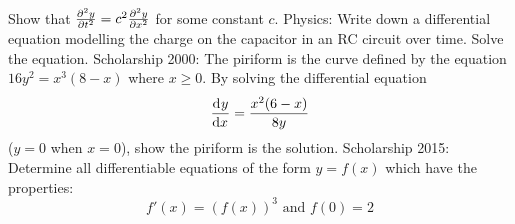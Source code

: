 \begin{questions}
            Show that $ \pd[2]{y}{t} = c^2 \pd[2]{y}{x} $ for some constant $ c $.
  \questioS Physics: Write down a differential equation modelling the charge on the capacitor in an RC circuit over time. Solve the equation.
  \questioS Scholarship 2000: The piriform is the curve defined by the equation $ 16y^2 = x^3(8-x) $ where $ x \geq 0 $.
            By solving the differential equation
            \begin{displaymath}
              \dod{y}{x} = \frac{x^2(6-x)}{8y}
            \end{displaymath}
            ($ y = 0 $ when $ x = 0 $), show the piriform is the solution.
  \questioS Scholarship 2015: Determine all differentiable equations of the form $ y = f(x) $ which have the properties:
    \begin{displaymath}
      f'(x) = (f(x))^3 \text{ and } f(0) = 2
    \end{displaymath}
\end{questions}

